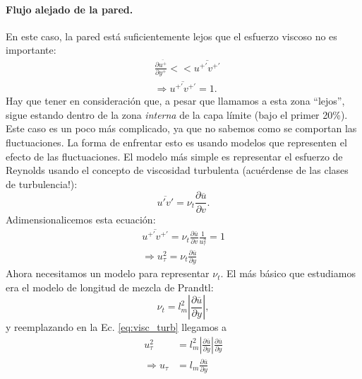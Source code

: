 \paragraph*{Flujo alejado de la pared.} En este caso, la pared está suficientemente lejos que el esfuerzo viscoso no es importante:
%
\begin{align}
&\frac{\partial\overline{u^+}}{\partial y^+} << \overline{u^{+\prime}v^{+\prime}}\nonumber\\
&\Rightarrow \overline{u^{+\prime}v^{+\prime}} = 1.
\end{align}
%
Hay que tener en consideración que, a pesar que llamamos a esta zona ``lejos'', sigue estando dentro de la zona \emph{interna} de la capa límite (bajo el primer 20\%).
Este caso es un poco más complicado, ya que no sabemos como se comportan las fluctuaciones.
La forma de enfrentar esto es usando modelos que representen el efecto de las fluctuaciones.
El modelo más simple es representar el esfuerzo de Reynolds usando el concepto de viscosidad turbulenta (acuérdense de las clases de turbulencia!):
%
\begin{equation}\label{eq:visc_turb}
\overline{u'v'} = \nu_t \frac{\partial\overline{u}}{\partial v}.
\end{equation}
%
Adimensionalicemos esta ecuación:
%
\begin{align}
\overline{u^{+\prime}v^{+\prime}} = \nu_t \frac{\partial\overline{u}}{\partial v}\frac{1}{u_\tau^2} = 1\nonumber\\
\Rightarrow u_\tau^2 = \nu_t \frac{\partial \overline{u}}{\partial y}
\end{align}
%
Ahora necesitamos un modelo para representar $\nu_t$.
El más básico que estudiamos era el modelo de longitud de mezcla de Prandtl:
%
\begin{equation}\label{eq:long_mezcla}
\nu_t = l_m^2\left|\frac{\partial\overline{u}}{\partial y}\right|,
\end{equation}
%
y reemplazando en la Ec. \eqref{eq:visc_turb} llegamos a
%
\begin{align}
u_\tau^2 &= l_m^2\left|\frac{\partial\overline{u}}{\partial y}\right|\frac{\partial\overline{u}}{\partial y} \nonumber\\
\Rightarrow u_\tau &= l_m\frac{\partial\overline{u}}{\partial y}
\end{align}
